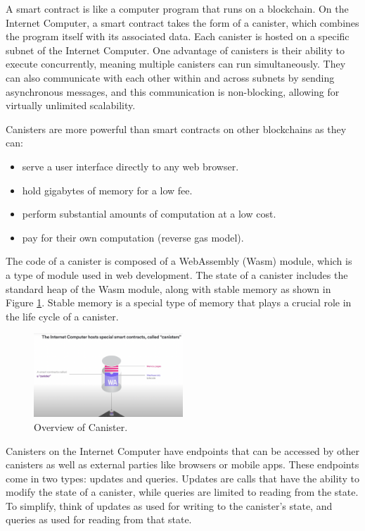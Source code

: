 A smart contract is like a computer program that runs on a blockchain. On the Internet Computer, a smart contract takes the form of a canister, which combines the program itself with its associated data. Each canister is hosted on a specific subnet of the Internet Computer. One advantage of canisters is their ability to execute concurrently, meaning multiple canisters can run simultaneously. They can also communicate with each other within and across subnets by sending asynchronous messages, and this communication is non-blocking, allowing for virtually unlimited scalability.

Canisters are more powerful than smart contracts on other blockchains as they can:

\begin{itemize}
    \item serve a user interface directly to any web browser.
    \item hold gigabytes of memory for a low fee.
    \item perform substantial amounts of computation at a low cost.
    \item pay for their own computation (reverse gas model).
\end{itemize}


The code of a canister is composed of a WebAssembly (Wasm) module, which is a type of module used in web development. The state of a canister includes the standard heap of the Wasm module, along with stable memory as shown in Figure \ref{fig:Canister}. Stable memory is a special type of memory that plays a crucial role in the life cycle of a canister.

\begin{figure}[H]
 \centering
  \includegraphics[width=0.5\textwidth]{canister overview.png}
  \caption{Overview of Canister.}
  \label{fig:Canister}
\end{figure}

Canisters on the Internet Computer have endpoints that can be accessed by other canisters as well as external parties like browsers or mobile apps. These endpoints come in two types: updates and queries. Updates are calls that have the ability to modify the state of a canister, while queries are limited to reading from the state. To simplify, think of updates as used for writing to the canister's state, and queries as used for reading from that state.

